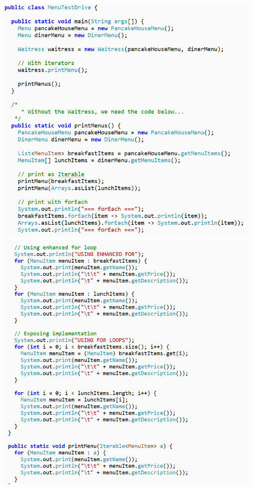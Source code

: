 \begin{center}
	\includegraphics[width=1\columnwidth]{GALLEYS/images/chapter3/images12}\\
	\includegraphics[width=1\columnwidth]{GALLEYS/images/chapter3/images13}\\
\end{center}
